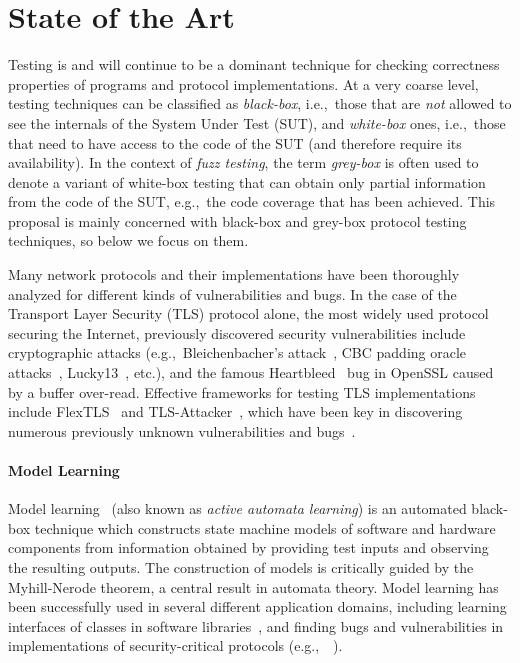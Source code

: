 \documentclass[11pt]{article}
\newcommand{\system}[1]{\mbox{\textsf{#1}}}
\newcommand{\myparagraph}{}
\let\myparagraph=\paragraph
\renewcommand{\paragraph}{\vspace{-3mm}\myparagraph}
\newcommand{\eg}{e.\/g.,\ }
\newcommand{\ie}{i.\/e.,\ }
\begin{document}
\section{State of the Art} \label{sec:SOTA}
Testing is and will continue to be a dominant technique for checking
correctness properties of programs and protocol implementations.  At a very
coarse level, testing techniques can be classified as \emph{black-box},
\ie those that are \emph{not} allowed to see the internals of the System Under
Test (SUT), and \emph{white-box} ones, \ie those that need to have access to
the code of the SUT (and therefore require its availability).  In the context
of \emph{fuzz testing}, the term \emph{grey-box} is often used to denote a
variant of white-box testing that can obtain only partial information from the
code of the SUT, \eg the code coverage that has been achieved.
%
This proposal is mainly concerned with black-box and grey-box protocol testing
techniques, so below we focus on them.

Many network protocols and their implementations have been thoroughly analyzed
for different kinds of vulnerabilities and bugs. In the case of the Transport
Layer Security (TLS) protocol alone, the most widely used protocol securing
the Internet, previously discovered security vulnerabilities include
cryptographic attacks (\eg Bleichenbacher's attack~\cite{Bleichenbacher1998},
CBC padding oracle attacks~\cite{Vaudenay:CBCWeaknesses:02},
Lucky13~\cite{Lucky13@SP-13}, etc.), and the famous
Heartbleed~\cite{heartbleed} bug in OpenSSL caused by a buffer over-read.
%
Effective frameworks for testing TLS implementations include
\system{FlexTLS}~\cite{FlexTLS@WOOT-15} and
\system{TLS-Attacker}~\cite{somorovsky2016}, which have been key in discovering
numerous previously unknown vulnerabilities and bugs~\cite{MessyTLS@CACM-17}.

\paragraph{Model Learning}
Model learning~\cite{Angluin1987,Vaandrager@CACM-17} (also known as
\emph{active automata learning}) is an automated black-box technique which
constructs state machine models of software and hardware components from
information obtained by providing test inputs and observing the resulting
outputs. The construction of models is critically guided by the Myhill-Nerode theorem, a central result
in automata theory. 
Model learning has been successfully used in several different
application domains, including learning interfaces of classes in software
libraries~\cite{ACMN:interfaces}, and finding bugs and vulnerabilities in
implementations of security-critical protocols
(\eg~\cite{AJUV15,ruiter2015,FJV2016,SSH@SPIN-17,DTLS@USENIX-20}).
\end{document}

